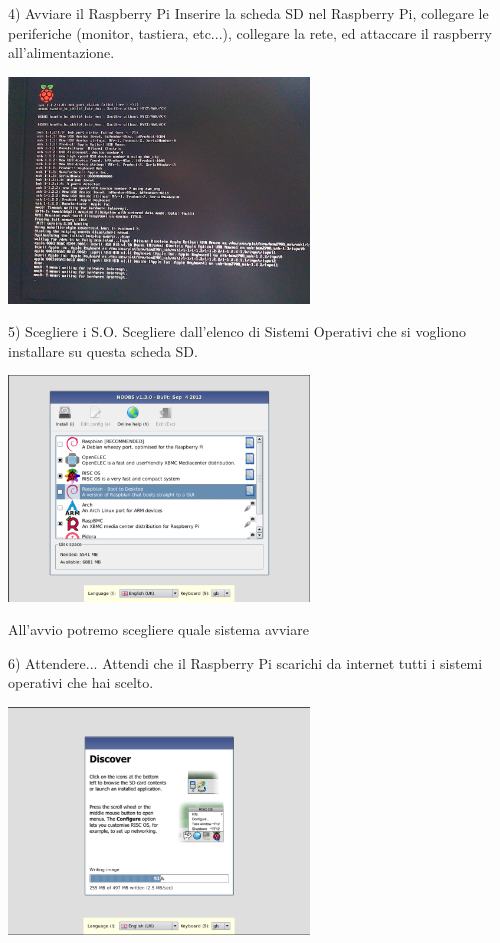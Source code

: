 \documentclass[xcolor=svgnames,11pt]{beamer}
\begin{document}
\begin{frame}{4) Avviare il Raspberry Pi}
Inserire la scheda SD nel Raspberry Pi, collegare le periferiche (monitor, tastiera, etc...), collegare la rete, ed attaccare il raspberry all'alimentazione.

\medskip
\begin{center}
\includegraphics[width=8cm]{guide/4.jpg}
\end{center}
\end{frame}



\begin{frame}{5) Scegliere i S.O.}
Scegliere dall'elenco di Sistemi Operativi che si vogliono installare su questa scheda SD.

\medskip
\begin{center}
\includegraphics[width=8cm]{guide/5.png}
\end{center}

All'avvio potremo scegliere quale sistema avviare

\end{frame}


\begin{frame}{6) Attendere...}
Attendi che il Raspberry Pi scarichi da internet tutti i sistemi operativi che hai scelto.

\medskip
\begin{center}
\includegraphics[width=8cm]{guide/6.png}
\end{center}
\end{frame}
\end{document}
